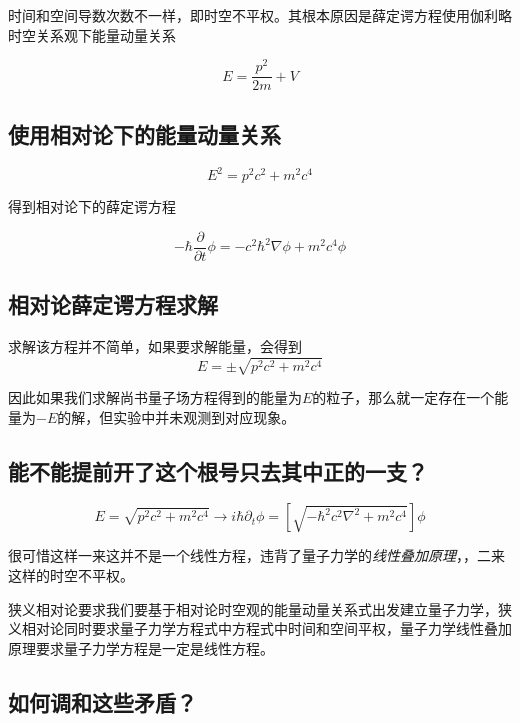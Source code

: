 时间和空间导数次数不一样，即时空不平权。其根本原因是薛定谔方程使用伽利略时空关系观下能量动量关系

\begin{equation}
    E=\frac{p^2}{2m}+V
\end{equation}

\subsection*{使用相对论下的能量动量关系}

\begin{equation}
    E^2=p^2c^2+m^2c^4
\end{equation}

得到相对论下的薛定谔方程

\begin{equation}
    -\hbar \frac{\partial}{\partial t}\phi=-c^2\hbar^2\nabla\phi+m^2c^4\phi
\end{equation}

\subsection*{相对论薛定谔方程求解}

求解该方程并不简单，如果要求解能量，会得到
\begin{equation}
    E=\pm \sqrt{p^2c^2+m^2c^4}
\end{equation}

因此如果我们求解尚书量子场方程得到的能量为$E$的粒子，那么就一定存在一个能量为$-E$的解，但实验中并未观测到对应现象。

\subsection*{能不能提前开了这个根号只去其中正的一支？}

\begin{equation}
    E=\sqrt{p^2c^2+m^2c^4}\longrightarrow i\hbar\partial_t\phi =[\sqrt{-\hbar^2c^2\nabla^2+m^2c^4}]\phi
\end{equation}

很可惜这样一来这并不是一个线性方程，违背了量子力学的\textsl{线性叠加原理}，，二来这样的时空不平权。

狭义相对论要求我们要基于相对论时空观的能量动量关系式出发建立量子力学，狭义相对论同时要求量子力学方程式中方程式中时间和空间平权，量子力学线性叠加原理要求量子力学方程是一定是线性方程。

\subsection*{如何调和这些矛盾？}

